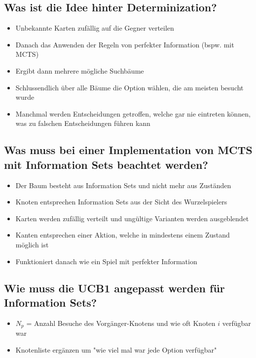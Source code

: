 \documentclass[a4paper]{article}
\begin{document}
		\subsection{Was ist die Idee hinter Determinization?}
		
		\begin{itemize}
			\item Unbekannte Karten zufällig auf die Gegner verteilen
			\item Danach das Anwenden der Regeln von perfekter Information (bspw. mit MCTS)
			\item Ergibt dann mehrere mögliche Suchbäume
			\item Schlussendlich über alle Bäume die Option wählen, die am meisten besucht wurde
			\item Manchmal werden Entscheidungen getroffen, welche gar nie eintreten können, was zu falschen Entscheidungen führen kann
		\end{itemize}
	
		\subsection{Was muss bei einer Implementation von MCTS mit Information Sets beachtet werden?}
		
		\begin{itemize}
			\item Der Baum besteht aus Information Sets und nicht mehr aus Zuständen
			\item Knoten entsprechen Information Sets aus der Sicht des Wurzelspielers
			\item Karten werden zufällig verteilt und ungültige Varianten werden ausgeblendet
			\item Kanten entsprechen einer Aktion, welche in mindestens einem Zustand möglich ist
			\item Funktioniert danach wie ein Spiel mit perfekter Information
		\end{itemize}
	
		\subsection{Wie muss die UCB1 angepasst werden für Information Sets?}
		
		\begin{itemize}
			\item $N_{p}$ = Anzahl Besuche des Vorgänger-Knotens und wie oft Knoten $i$ verfügbar war
			\item Knotenliste ergänzen um "wie viel mal war jede Option verfügbar"
		\end{itemize}
	
	
		
		
		
		
		
		
		
	
\end{document}
